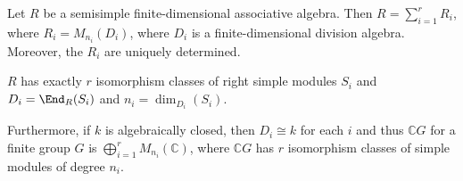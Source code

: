 Let $R$ be a semisimple finite-dimensional associative algebra. Then
$R = \sum_{i = 1}^r R_i$, where $R_i = M_{n_i}(D_i)$, where $D_i$ is a
finite-dimensional division algebra. Moreover, the $R_i$ are uniquely determined.

$R$ has exactly $r$ isomorphism classes of right simple modules $S_i$ and
$D_i = \End_R(S_i)$ and $n_i = \dim_{D_i}(S_i)$.

Furthermore, if $k$ is algebraically closed, then $D_i \cong k$ for each $i$ and
thus $\mathbb{C}G$ for a finite group $G$ is $\bigoplus_{i=1}^r M_{n_i}(\mathbb{C})$,
where $\mathbb{C}G$ has $r$ isomorphism classes of simple modules of degree $n_i$.
